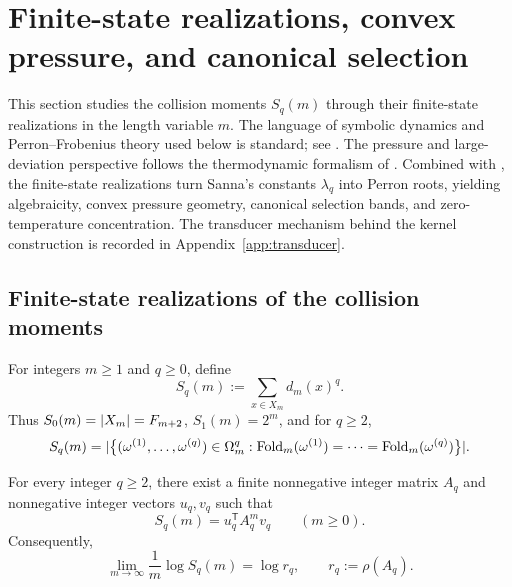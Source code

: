 \section{Finite-state realizations, convex pressure, and canonical selection}
\label{sec:moment-kernel}

This section studies the collision moments \(S_q(m)\) through their finite-state
realizations in the length variable \(m\).  The language of symbolic dynamics
and Perron--Frobenius theory used below is standard; see
\cite{LindMarcus1995,Seneta2006}.  The pressure and large-deviation
perspective follows the thermodynamic formalism of
\cite{DemboZeitouni2010}.  Combined with , the
finite-state realizations turn Sanna's constants \(\lambda_q\) into
Perron roots, yielding algebraicity, convex pressure geometry, canonical
selection bands, and zero-temperature concentration.  The transducer
mechanism behind the kernel construction is recorded in
Appendix~\ref{app:transducer}.

\subsection{Finite-state realizations of the collision moments}

\begin{definition}
\label{def:collision-moments}
For integers \(m\ge 1\) and \(q\ge 0\), define
\[
  S_q(m):=\sum_{x\in X_m} d_m(x)^q.
\]
Thus \(S_0(m)=\lvert X_m \rvert=F_{m+2}\), \(S_1(m)=2^m\), and for \(q\ge 2\),
\[
  S_q(m)
  =
  \lvert \bigl\{(\omega^{(1)},\dots,\omega^{(q)})\in\Omega_m^q:
  \mathrm{Fold}_m(\omega^{(1)})=\cdots=\mathrm{Fold}_m(\omega^{(q)})\bigr\} \rvert.
\]
\end{definition}

\begin{theorem}
\label{thm:collision-kernel}
For every integer \(q\ge 2\), there exist a finite nonnegative integer matrix
\(A_q\) and nonnegative integer vectors \(u_q,v_q\) such that
\[
  S_q(m)=u_q^{\mathsf T}A_q^m v_q
  \qquad (m\ge 0).
\]
Consequently,
\[
  \lim_{m\to\infty}\frac{1}{m}\log S_q(m)=\log r_q,
  \qquad
  r_q:=\rho(A_q).
\]
\end{theorem}

